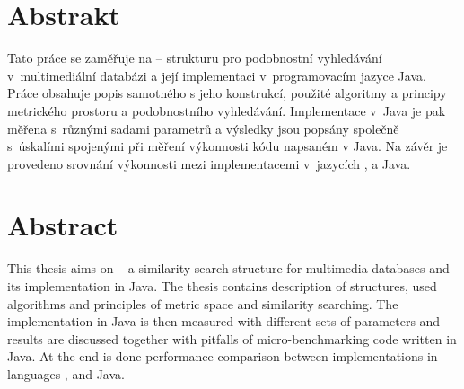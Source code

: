 \section*{Abstrakt}
Tato práce se zaměřuje na \MIndex{} -- strukturu pro podobnostní vyhledávání v~multimediální databázi a její implementaci v~programovacím jazyce Java.
Práce obsahuje popis samotného  s jeho konstrukcí, použité algoritmy a principy metrického prostoru a podobnostního vyhledávání.
Implementace v~Java je pak měřena s~různými sadami parametrů  a výsledky jsou popsány společně s~úskalími spojenými při měření výkonnosti kódu napsaném v Java.
Na závěr je provedeno srovnání výkonnosti mezi implementacemi  v~jazycích \CC{}, \CS{} a Java.

\section*{Abstract}
This thesis aims on \MIndex{} -- a similarity search structure for multimedia databases and its implementation in Java.
The thesis contains description of \MIndex{} structures, used algorithms and principles of metric space and similarity searching.
The implementation in Java is then measured with different sets of parameters and results are discussed together with pitfalls of micro-benchmarking code written in Java.
At the end is done performance comparison between \MIndex{} implementations in languages \CC{}, \CS{} and Java.
\newpage